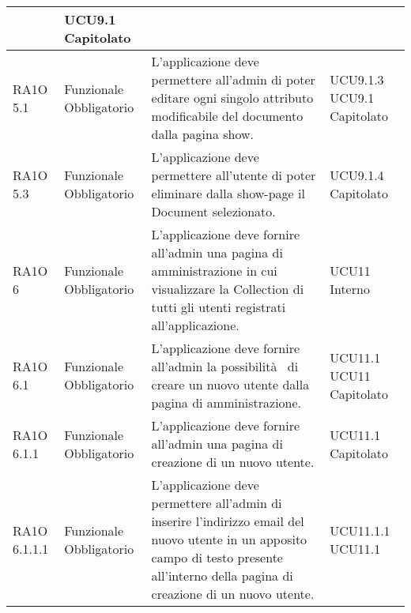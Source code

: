 \begin{center}
\begin{longtable}{ | l | p{2cm} | p{5cm} | p{1.7cm} |}
 &  UCU9.1 \newline  Capitolato \newline  \\ \hline      
        RA1O 5.1 & Funzionale \newline  Obbligatorio  & L'applicazione deve permettere all'admin di poter editare ogni singolo attributo modificabile del documento dalla pagina show. &  UCU9.1.3 \newline  UCU9.1 \newline  Capitolato \newline  \\ \hline      
        RA1O 5.3 & Funzionale \newline  Obbligatorio  & L'applicazione deve permettere all'utente di poter eliminare dalla show-page il Document selezionato. &  UCU9.1.4 \newline  Capitolato \newline  \\ \hline      
        RA1O 6 & Funzionale \newline  Obbligatorio  & L'applicazione deve fornire all'admin una pagina di amministrazione in cui visualizzare la Collection di tutti gli utenti registrati all'applicazione.
 &  UCU11 \newline  Interno \newline  \\ \hline      
        RA1O 6.1  & Funzionale \newline  Obbligatorio  & L'applicazione deve fornire all'admin la possibilità  di creare un nuovo utente dalla pagina di amministrazione. &  UCU11.1 \newline  UCU11 \newline  Capitolato \newline  \\ \hline      
        RA1O 6.1.1  & Funzionale \newline  Obbligatorio  & L'applicazione deve fornire all'admin una pagina di creazione di un nuovo utente. &  UCU11.1 \newline  Capitolato \newline  \\ \hline      
        RA1O 6.1.1.1  & Funzionale \newline  Obbligatorio  & L'applicazione deve permettere all'admin di inserire l'indirizzo email del nuovo utente in un apposito campo di testo presente all'interno della pagina di creazione di un nuovo utente.
 &  UCU11.1.1 \newline  UCU11.1 \newline  \\ \hline      

\end{longtable}
\end{center}
